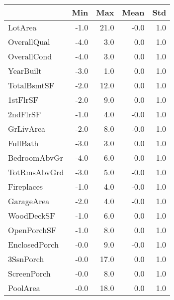 \begin{tabular}{lrrrr}
\toprule
{} &  Min &   Max &  Mean &  Std \\
\midrule
LotArea       & -1.0 &  21.0 &  -0.0 &  1.0 \\
OverallQual   & -4.0 &   3.0 &   0.0 &  1.0 \\
OverallCond   & -4.0 &   3.0 &   0.0 &  1.0 \\
YearBuilt     & -3.0 &   1.0 &   0.0 &  1.0 \\
TotalBsmtSF   & -2.0 &  12.0 &   0.0 &  1.0 \\
1stFlrSF      & -2.0 &   9.0 &   0.0 &  1.0 \\
2ndFlrSF      & -1.0 &   4.0 &  -0.0 &  1.0 \\
GrLivArea     & -2.0 &   8.0 &  -0.0 &  1.0 \\
FullBath      & -3.0 &   3.0 &   0.0 &  1.0 \\
BedroomAbvGr  & -4.0 &   6.0 &   0.0 &  1.0 \\
TotRmsAbvGrd  & -3.0 &   5.0 &  -0.0 &  1.0 \\
Fireplaces    & -1.0 &   4.0 &  -0.0 &  1.0 \\
GarageArea    & -2.0 &   4.0 &  -0.0 &  1.0 \\
WoodDeckSF    & -1.0 &   6.0 &   0.0 &  1.0 \\
OpenPorchSF   & -1.0 &   8.0 &   0.0 &  1.0 \\
EnclosedPorch & -0.0 &   9.0 &  -0.0 &  1.0 \\
3SsnPorch     & -0.0 &  17.0 &   0.0 &  1.0 \\
ScreenPorch   & -0.0 &   8.0 &   0.0 &  1.0 \\
PoolArea      & -0.0 &  18.0 &   0.0 &  1.0 \\
\bottomrule
\end{tabular}
